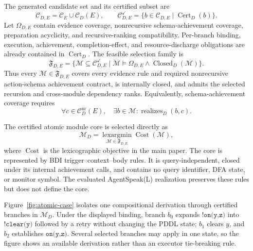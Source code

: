 \begin{definition}
The generated candidate set and its certified subset are
\[
\mathcal C_{D,E}=\mathcal C_E\cup\mathcal C_D(E),
\qquad
\mathcal C^{\checkmark}_{D,E}=
\{b\in\mathcal C_{D,E}\mid\operatorname{Cert}_D(b)\}.
\]
Let $\Omega_{D,E}$ contain evidence coverage, nonrecursive schema-achievement
coverage, preparation acyclicity, and recursive-ranking compatibility.
Per-branch binding, execution, achievement, completion-effect,
and resource-discharge obligations are already contained in
$\operatorname{Cert}_D$. The feasible selection family is
\[
\mathfrak F_{D,E}=
\{\mathcal M\subseteq\mathcal C^{\checkmark}_{D,E}\mid
\mathcal M\models\Omega_{D,E}\land
\operatorname{Closed}_D(\mathcal M)\}.
\]
Thus every $\mathcal M\in\mathfrak F_{D,E}$ covers every evidence rule and required
nonrecursive action-schema achievement contract, is internally closed, and
admits the selected recursion and cross-module dependency ranks.
Equivalently, schema-achievement coverage requires
\[
\forall c\in\mathcal C_D^{\mathrm{nr}}(E),\quad
\exists b\in\mathcal M:\operatorname{realizes}_D(b,c).
\]
\end{definition}

The certified atomic module core is selected directly as
\[
\mathcal M_D=
\operatorname*{lexargmin}_{\mathcal M\in\mathfrak F_{D,E}}
\operatorname{Cost}(\mathcal M),
\]
where $\operatorname{Cost}$ is the lexicographic objective in the main paper.
The core is represented by BDI trigger--context--body rules. It is
query-independent, closed under its internal achievement calls, and contains
no query identifier, DFA state, or monitor symbol. The evaluated AgentSpeak(L)
realization preserves these rules but does not define the core.

Figure~\ref{fig:atomic-case} isolates one compositional derivation through
certified branches in $\mathcal M_D$. Under the displayed binding, branch $b_0$
expands $\texttt{!on(y,z)}$ into $\texttt{!clear(y)}$ followed by a retry without
changing the PDDL state; $b_1$ clears $y$, and $b_2$ establishes
$\texttt{on(y,z)}$. Several selected branches may apply in one state, so the
figure shows an available derivation rather than an executor tie-breaking rule.

